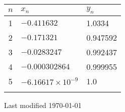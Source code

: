 \documentclass[11pt,a4paper]{article}
\begin{document}
\begin{enumerate}
{\begin{enumerate}
\begin{center}
\begin{tabular}{| c |  ll | }
		$n$& $x_n$ & $y_n$  \\ \hline
	1&	$-0.411632$& 1.0334 \\
	2&	$	-0.171321$& 0.947592\\
	3&	$	-0.0283247$&0.992437\\
	4&	$		-0.000302864$& 0.999955\\
	5 & $-6.16617\times 10^{-9}$& 1.0 \\
	\\
		\hline
	\end{tabular}
\end{center}

	
\end{enumerate}	
}{}

\end{enumerate}
\hfill {\tiny Last modified  \today}
\vfill\eject
\end{document}

